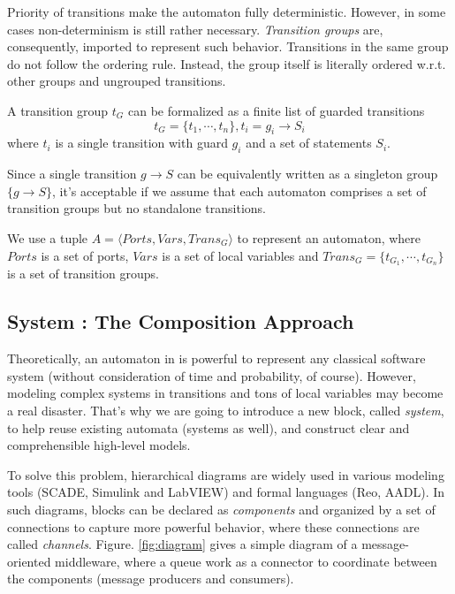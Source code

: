 Priority of transitions make the automaton fully deterministic. However, in some cases non-determinism is still rather necessary. \emph{Transition groups} are, consequently, imported to represent such behavior. Transitions in the same group do not follow the ordering rule. Instead, the group itself is literally ordered w.r.t. other groups and ungrouped transitions.

\begin{formalization}
    A transition group $t_G$ can be formalized as a finite list of guarded transitions
    \[
        t_G=\{t_1,\cdots, t_n\}, t_i=g_i\rightarrow S_i
    \]
    where $t_i$ is a single transition with guard $g_i$ and a set of statements $S_i$.
\end{formalization}

Since a single transition $g\rightarrow S$ can be equivalently written as a singleton group $\{g\rightarrow S\}$, it's acceptable if we assume that each automaton comprises a set of transition groups but no standalone transitions.

\begin{formalization}[Automata]
    We use a tuple $A=\langle Ports, Vars, Trans_G \rangle$ to represent an automaton, where $Ports$ is a set of ports, $Vars$ is a set of local variables and $Trans_G=\{t_{G_1},\cdots,t_{G_n}\}$ is a set of transition groups.
\end{formalization}

\subsection{System : The Composition Approach}
\label{subsec:system}

Theoretically, an automaton in \lang{} is powerful to represent any classical software system (without consideration of time and probability, of course). However, modeling complex systems in transitions and tons of local variables may become a real disaster. That's why we are going to introduce a new block, called \emph{system}, to help reuse existing automata (systems as well), and construct clear and comprehensible high-level models.

To solve this problem, hierarchical diagrams are widely used in various modeling tools (SCADE\cite{AbdullaISoLA2006,BerryScp1992}, Simulink and LabVIEW) and formal languages (Reo\cite{ArbabMscsReo2004}, AADL). In such diagrams, blocks can be declared as \emph{components} and organized by a set of connections to capture more powerful behavior, where these connections are called \emph{channels}. Figure. \ref{fig:diagram} gives a simple diagram of a message-oriented middleware, where a queue work as a connector to coordinate between the components (message producers and consumers).

